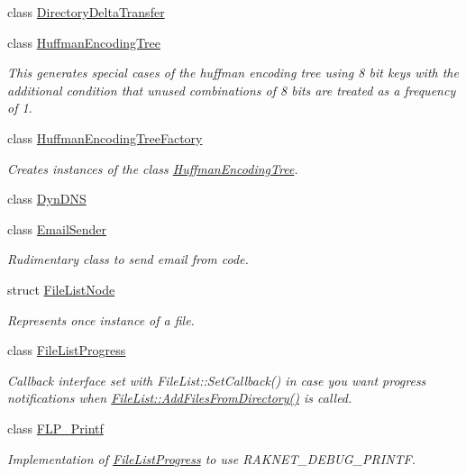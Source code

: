 \begin{DoxyCompactItemize}
class \hyperlink{class_rak_net_1_1_directory_delta_transfer}{Directory\-Delta\-Transfer}
\item 
class \hyperlink{class_rak_net_1_1_huffman_encoding_tree}{Huffman\-Encoding\-Tree}
\begin{DoxyCompactList}\small\item\em This generates special cases of the huffman encoding tree using 8 bit keys with the additional condition that unused combinations of 8 bits are treated as a frequency of 1. \end{DoxyCompactList}\item 
class \hyperlink{class_rak_net_1_1_huffman_encoding_tree_factory}{Huffman\-Encoding\-Tree\-Factory}
\begin{DoxyCompactList}\small\item\em Creates instances of the class \hyperlink{class_rak_net_1_1_huffman_encoding_tree}{Huffman\-Encoding\-Tree}. \end{DoxyCompactList}\item 
class \hyperlink{class_rak_net_1_1_dyn_d_n_s}{Dyn\-D\-N\-S}
\item 
class \hyperlink{class_rak_net_1_1_email_sender}{Email\-Sender}
\begin{DoxyCompactList}\small\item\em Rudimentary class to send email from code. \end{DoxyCompactList}\item 
struct \hyperlink{struct_rak_net_1_1_file_list_node}{File\-List\-Node}
\begin{DoxyCompactList}\small\item\em Represents once instance of a file. \end{DoxyCompactList}\item 
class \hyperlink{class_rak_net_1_1_file_list_progress}{File\-List\-Progress}
\begin{DoxyCompactList}\small\item\em Callback interface set with File\-List\-::\-Set\-Callback() in case you want progress notifications when \hyperlink{class_rak_net_1_1_file_list_a9ff81c1d5fb8ad1897fd6b6b12108cf8}{File\-List\-::\-Add\-Files\-From\-Directory()} is called. \end{DoxyCompactList}\item 
class \hyperlink{class_rak_net_1_1_f_l_p___printf}{F\-L\-P\-\_\-\-Printf}
\begin{DoxyCompactList}\small\item\em Implementation of \hyperlink{class_rak_net_1_1_file_list_progress}{File\-List\-Progress} to use R\-A\-K\-N\-E\-T\-\_\-\-D\-E\-B\-U\-G\-\_\-\-P\-R\-I\-N\-T\-F. \end{DoxyCompactList}\item 

\end{DoxyCompactItemize}
